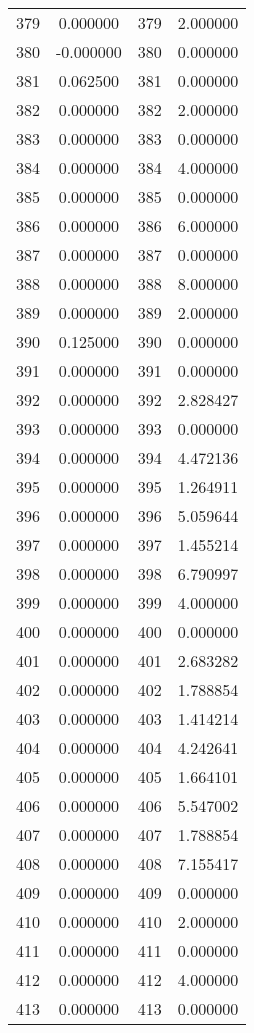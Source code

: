 \documentclass[12pt]{article}
\begin{document}
\begin{longtable}{@{}cccc@{}}
379 & 0.000000 & 379 & 2.000000 \\
380 & -0.000000 & 380 & 0.000000 \\
381 & 0.062500 & 381 & 0.000000 \\
382 & 0.000000 & 382 & 2.000000 \\
383 & 0.000000 & 383 & 0.000000 \\
384 & 0.000000 & 384 & 4.000000 \\
385 & 0.000000 & 385 & 0.000000 \\
386 & 0.000000 & 386 & 6.000000 \\
387 & 0.000000 & 387 & 0.000000 \\
388 & 0.000000 & 388 & 8.000000 \\
389 & 0.000000 & 389 & 2.000000 \\
390 & 0.125000 & 390 & 0.000000 \\
391 & 0.000000 & 391 & 0.000000 \\
392 & 0.000000 & 392 & 2.828427 \\
393 & 0.000000 & 393 & 0.000000 \\
394 & 0.000000 & 394 & 4.472136 \\
395 & 0.000000 & 395 & 1.264911 \\
396 & 0.000000 & 396 & 5.059644 \\
397 & 0.000000 & 397 & 1.455214 \\
398 & 0.000000 & 398 & 6.790997 \\
399 & 0.000000 & 399 & 4.000000 \\
400 & 0.000000 & 400 & 0.000000 \\
401 & 0.000000 & 401 & 2.683282 \\
402 & 0.000000 & 402 & 1.788854 \\
403 & 0.000000 & 403 & 1.414214 \\
404 & 0.000000 & 404 & 4.242641 \\
405 & 0.000000 & 405 & 1.664101 \\
406 & 0.000000 & 406 & 5.547002 \\
407 & 0.000000 & 407 & 1.788854 \\
408 & 0.000000 & 408 & 7.155417 \\
409 & 0.000000 & 409 & 0.000000 \\
410 & 0.000000 & 410 & 2.000000 \\
411 & 0.000000 & 411 & 0.000000 \\
412 & 0.000000 & 412 & 4.000000 \\
413 & 0.000000 & 413 & 0.000000 \\

\end{longtable}
\end{document}

